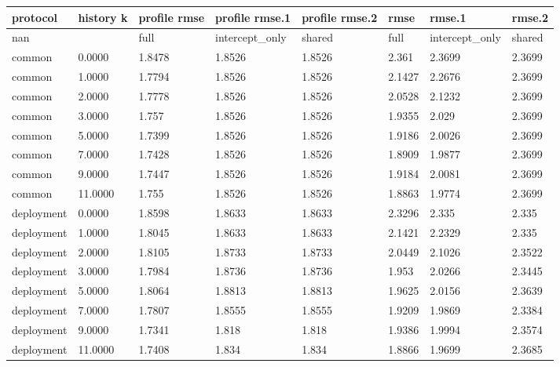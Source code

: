 {\footnotesize\setlength{\tabcolsep}{3pt}
\begin{longtable}{llllllll}
\toprule
\textbf{protocol} & \textbf{history k} & \textbf{profile rmse} & \textbf{profile rmse.1} & \textbf{profile rmse.2} & \textbf{rmse} & \textbf{rmse.1} & \textbf{rmse.2} \\
\midrule
\endhead
nan &  & full & intercept\_only & shared & full & intercept\_only & shared \\
common & 0.0000 & 1.8478 & 1.8526 & 1.8526 & 2.361 & 2.3699 & 2.3699 \\
common & 1.0000 & 1.7794 & 1.8526 & 1.8526 & 2.1427 & 2.2676 & 2.3699 \\
common & 2.0000 & 1.7778 & 1.8526 & 1.8526 & 2.0528 & 2.1232 & 2.3699 \\
common & 3.0000 & 1.757 & 1.8526 & 1.8526 & 1.9355 & 2.029 & 2.3699 \\
common & 5.0000 & 1.7399 & 1.8526 & 1.8526 & 1.9186 & 2.0026 & 2.3699 \\
common & 7.0000 & 1.7428 & 1.8526 & 1.8526 & 1.8909 & 1.9877 & 2.3699 \\
common & 9.0000 & 1.7447 & 1.8526 & 1.8526 & 1.9184 & 2.0081 & 2.3699 \\
common & 11.0000 & 1.755 & 1.8526 & 1.8526 & 1.8863 & 1.9774 & 2.3699 \\
deployment & 0.0000 & 1.8598 & 1.8633 & 1.8633 & 2.3296 & 2.335 & 2.335 \\
deployment & 1.0000 & 1.8045 & 1.8633 & 1.8633 & 2.1421 & 2.2329 & 2.335 \\
deployment & 2.0000 & 1.8105 & 1.8733 & 1.8733 & 2.0449 & 2.1026 & 2.3522 \\
deployment & 3.0000 & 1.7984 & 1.8736 & 1.8736 & 1.953 & 2.0266 & 2.3445 \\
deployment & 5.0000 & 1.8064 & 1.8813 & 1.8813 & 1.9625 & 2.0156 & 2.3639 \\
deployment & 7.0000 & 1.7807 & 1.8555 & 1.8555 & 1.9209 & 1.9869 & 2.3384 \\
deployment & 9.0000 & 1.7341 & 1.818 & 1.818 & 1.9386 & 1.9994 & 2.3574 \\
deployment & 11.0000 & 1.7408 & 1.834 & 1.834 & 1.8866 & 1.9699 & 2.3685 \\
\bottomrule
\end{longtable}}

